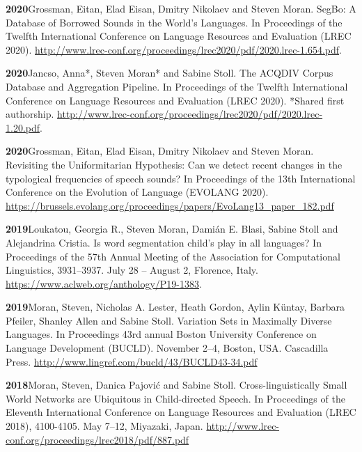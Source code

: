 \documentclass[11pt]{article}
\newcommand{\hangpara}{
 \setlength{\parindent}{0in} %
 \hangindent=0.42in %
}
\begin{document}
\vskip 6pt
\hangpara
{\bf 2020}\hspace{1ex}Grossman, Eitan, Elad Eisan, Dmitry Nikolaev and Steven Moran. SegBo: A Database of Borrowed Sounds in the World's Languages. In Proceedings of the Twelfth International Conference on Language Resources and Evaluation (LREC 2020). \url{http://www.lrec-conf.org/proceedings/lrec2020/pdf/2020.lrec-1.654.pdf}. %

\vskip 6pt
\hangpara
{\bf 2020}\hspace{1ex}Jancso, Anna*, Steven Moran*  and Sabine Stoll. The ACQDIV Corpus Database and Aggregation Pipeline. In Proceedings of the Twelfth International Conference on Language Resources and Evaluation (LREC 2020). *Shared first authorship. \url{http://www.lrec-conf.org/proceedings/lrec2020/pdf/2020.lrec-1.20.pdf}. %

\vskip 6pt
\hangpara
{\bf 2020}\hspace{1ex}Grossman, Eitan, Elad Eisan, Dmitry Nikolaev and Steven Moran. Revisiting the Uniformitarian Hypothesis: Can we detect recent changes in the typological frequencies of speech sounds?  In Proceedings of the 13th International Conference on the Evolution of Language (EVOLANG 2020). \url{https://brussels.evolang.org/proceedings/papers/EvoLang13_paper_182.pdf} %

\vskip 6pt
\hangpara
{\bf 2019}\hspace{1ex}Loukatou, Georgia R., Steven Moran, Dami{\'a}n E. Blasi, Sabine Stoll and Alejandrina Cristia. Is word segmentation child's play in all languages? In Proceedings of the 57th Annual Meeting of the Association for Computational Linguistics, 3931--3937. July 28 -- August 2, Florence, Italy.  \url{https://www.aclweb.org/anthology/P19-1383}.

\vskip 6pt
\hangpara
{\bf 2019}\hspace{1ex}Moran, Steven, Nicholas A. Lester, Heath Gordon, Aylin Küntay, Barbara Pfeiler, Shanley Allen and Sabine Stoll. Variation Sets in Maximally Diverse Languages. In Proceedings 43rd annual Boston University Conference on Language Development (BUCLD). November 2--4, Boston, USA. Cascadilla Press. \url{http://www.lingref.com/bucld/43/BUCLD43-34.pdf}

\vskip 6pt
\hangpara
{\bf 2018}\hspace{1ex}Moran, Steven, Danica Pajovi{\'c} and Sabine Stoll. Cross-linguistically Small World Networks are Ubiquitous in Child-directed Speech. In Proceedings of the Eleventh International Conference on Language Resources and Evaluation (LREC 2018), 4100-4105. May 7--12, Miyazaki, Japan.  \url{http://www.lrec-conf.org/proceedings/lrec2018/pdf/887.pdf}
\end{document}
